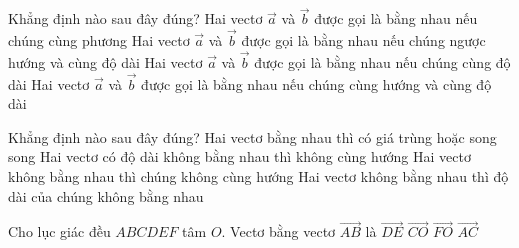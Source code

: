 

\begin{ex}%
	Khẳng  định nào sau đây đúng?
	\choice 
		{Hai vectơ $\overrightarrow{a}$ và $\overrightarrow{b}$ được gọi là bằng nhau nếu  chúng cùng phương}
		{Hai vectơ $\overrightarrow{a}$  và $\overrightarrow{b}$ được gọi là bằng nhau nếu chúng ngược hướng và cùng độ dài}
		{Hai vectơ $\overrightarrow{a}$ và $\overrightarrow{b}$ được gọi là bằng nhau nếu chúng cùng độ  dài}
		{\True Hai vectơ $\overrightarrow{a}$ và $\overrightarrow{b}$ được gọi là bằng nhau nếu  chúng cùng hướng và cùng độ dài}
\end{ex}

\begin{ex}%
	Khẳng  định nào sau đây đúng?
	 \choice
		{\True Hai vectơ bằng nhau thì có giá trùng hoặc song  song}
		 {Hai vectơ có độ dài không bằng nhau thì không cùng hướng}
		{Hai vectơ không  bằng nhau thì chúng không cùng hướng}
		{Hai vectơ không bằng nhau thì độ dài của chúng không bằng nhau} 
\end{ex}

\begin{ex}%
	 Cho lục giác đều $ABCDEF$ tâm $O$. Vectơ bằng vectơ $\overrightarrow{AB}$ là
	\choice 
		{$\overrightarrow{DE}$} 
		{$\overrightarrow{CO}$} 
		{\True  $\overrightarrow{FO}$}
		 {$\overrightarrow{AC}$}
\end{ex}


